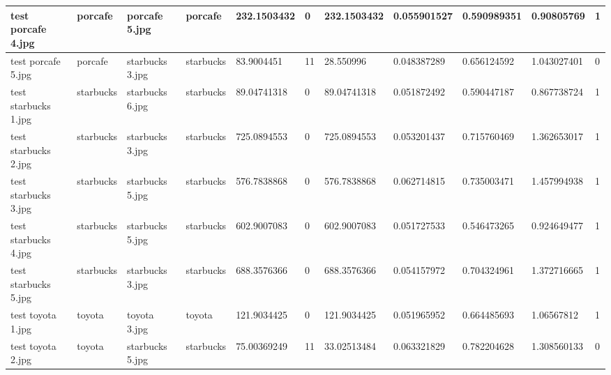 \begin{landscape}
\begin{longtable}{|p{2cm}|p{1.5cm}|p{2cm}|p{1.5cm}|p{2cm}|p{1cm}|p{2cm}|p{2cm}|p{2cm}|p{2cm}|p{1cm}|}
		test porcafe 4.jpg   & porcafe          & porcafe 5.jpg         & porcafe                     & 232.1503432           & 0                       & 232.1503432                & 0.055901527           & 0.590989351           & 0.90805769               & 1                \\ \hline
		test porcafe 5.jpg   & porcafe          & starbucks 3.jpg       & starbucks                   & 83.9004451            & 11                      & 28.550996                  & 0.048387289           & 0.656124592           & 1.043027401              & 0                \\ \hline
		test starbucks 1.jpg & starbucks        & starbucks 6.jpg       & starbucks                   & 89.04741318           & 0                       & 89.04741318                & 0.051872492           & 0.590447187           & 0.867738724              & 1                \\ \hline
		test starbucks 2.jpg & starbucks        & starbucks 3.jpg       & starbucks                   & 725.0894553           & 0                       & 725.0894553                & 0.053201437           & 0.715760469           & 1.362653017              & 1                \\ \hline
		test starbucks 3.jpg & starbucks        & starbucks 5.jpg       & starbucks                   & 576.7838868           & 0                       & 576.7838868                & 0.062714815           & 0.735003471           & 1.457994938              & 1                \\ \hline
		test starbucks 4.jpg & starbucks        & starbucks 5.jpg       & starbucks                   & 602.9007083           & 0                       & 602.9007083                & 0.051727533           & 0.546473265           & 0.924649477              & 1                \\ \hline
		test starbucks 5.jpg & starbucks        & starbucks 3.jpg       & starbucks                   & 688.3576366           & 0                       & 688.3576366                & 0.054157972           & 0.704324961           & 1.372716665              & 1                \\ \hline
		test toyota 1.jpg    & toyota           & toyota 3.jpg          & toyota                      & 121.9034425           & 0                       & 121.9034425                & 0.051965952           & 0.664485693           & 1.06567812               & 1                \\ \hline
		test toyota 2.jpg    & toyota           & starbucks 5.jpg       & starbucks                   & 75.00369249           & 11                      & 33.02513484                & 0.063321829           & 0.782204628           & 1.308560133              & 0                \\ \hline

\end{longtable}
\end{landscape}
